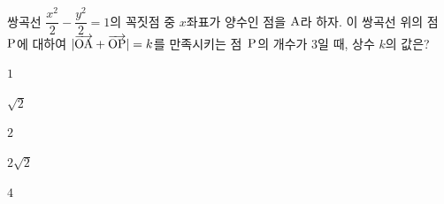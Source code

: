 쌍곡선 $\dfrac{x^2}{2}-\dfrac{y^2}{2}=1$의 꼭짓점 중 $x$좌표가 양수인 점을 $\mathrm{A}$라 하자. 이 쌍곡선 위의 점~$\mathrm{P}$에 대하여 $|\overrightarrow{\mathrm{OA}}+\overrightarrow{\mathrm{OP}}|=k$를 만족시키는 점~$\mathrm{P}$의 개수가 $3$일 때, 상수 $k$의 값은? 
\begin{choices32}{\rule[-3ex]{0pt}{8ex}$1$}{\rule[-3ex]{0pt}{8ex}$\sqrt{2}$}{\rule[-3ex]{0pt}{8ex}$2$}{\rule[-3ex]{0pt}{8ex}$2\sqrt{2}$}{\rule[-3ex]{0pt}{8ex}$4$}\end{choices32}
